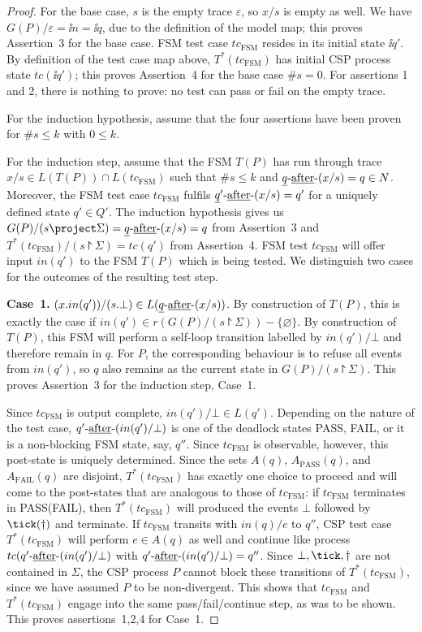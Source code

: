 \begin{proof}
For the base case, $s$ is the empty trace $\varepsilon$, so $x/s$ is empty as well. We have
$G(P)/\varepsilon = \ii n = \ii q$, due to the definition of the model map; this proves Assertion~3 for the base case.
FSM test case $tc_\text{FSM}$ resides in its initial state $\ii q'$. By definition of the test case map above, $T^*(tc_\text{FSM})$ has initial CSP process state $tc(\ii q')$; this proves  Assertion~4 for the base case $\#s = 0$. For assertions 1 and 2, there is nothing to
prove: no test can pass or fail on the empty trace.

For the induction hypothesis, assume that the four assertions have been proven for
$\#s \le k$ with $0\le k$.

For the induction step, assume that the FSM $T(P)$
has run through trace $x/s\in L(T(P))\cap L(tc_\text{FSM})$ such that
$\#s \le k$ and $\underline{q}\text{-\underline{after}-}(x/s) = q\in N$. Moreover, the FSM test case
$tc_\text{FSM}$ fulfils  $\underline{q}'\text{-\underline{after}-} (x/s) = q'$ for a uniquely defined state
$q'\in Q'$. The induction hypothesis gives us
$G(P)/(s\project\Sigma) = \ii q\after (x/s) = q$
from Assertion~3 and
$T^*(tc_\text{FSM})/(s\project \Sigma) = tc(q')$ from Assertion~4.
FSM test $tc_\text{FSM}$ will offer input $in(q')$ to the FSM $T(P)$ which is being tested. We distinguish two cases  for the outcomes of the resulting test step.


\medskip
\noindent
{\bf Case~1.} $(x.in(q'))/(s.\bot) \in L(\underline{q}\text{-\underline{after}-} (x/s))$.\newline
By construction of $T(P)$, this is exactly the case if
$in(q')\in r(G(P)/(s\project \Sigma)) - \{ \varnothing\}$. By construction of $T(P)$,
this FSM will perform a self-loop transition labelled by $in(q')/\bot$ and therefore remain in $q$. For $P$, the corresponding behaviour is to refuse all events from
$in(q')$, so $q$ also remains as the current state in $G(P)/(s\project \Sigma)$. This proves Assertion~3 for the induction step, Case~1.

Since $tc_\text{FSM}$ is output complete,
$in(q')/\bot \in L(q')$. Depending on the nature of the test case,
$q'\text{-\underline{after}-} (in(q')/\bot)$ is one of the deadlock states PASS, FAIL, or it is a
non-blocking FSM state, say, $q''$. Since $tc_\text{FSM}$ is observable, however,
this post-state is uniquely determined.
Since the sets $A(q)$, $A_\text{PASS}(q)$, and $A_\text{FAIL}(q)$
are disjoint,   $T^*(tc_\text{FSM})$
has exactly one choice to proceed and will come to the post-states that are analogous to those of $tc_\text{FSM}$: if $tc_\text{FSM}$ terminates in PASS(FAIL), then
$T^*(tc_\text{FSM})$ will produced the events $\bot$ followed by
$\tick(\dag)$ and terminate. If $tc_\text{FSM}$  transits with $in(q)/e$ to $q''$, CSP test case
$T^*(tc_\text{FSM})$ will perform $e\in A(q)$ as well and continue like process
$tc(q'\text{-\underline{after}-}(in(q')/\bot)$ with $q'\text{-\underline{after}-}(in(q')/\bot) = q''$.
Since $\bot,\tick,\dag$ are not contained in $\Sigma$, the CSP process $P$
cannot block these transitions of  $T^*(tc_\text{FSM})$, since we have assumed $P$ to be non-divergent. This shows that $tc_\text{FSM}$ and $T^*(tc_\text{FSM})$ engage into the same pass/fail/continue step, as was to be shown. This proves assertions~1,2,4
for Case~1.





\end{proof}
